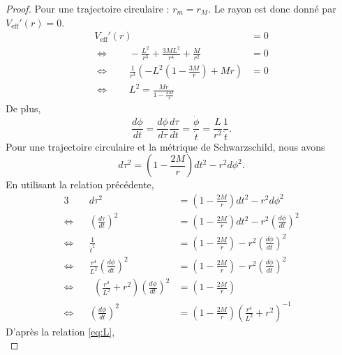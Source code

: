\documentclass[a4paper,11pt]{report}
\begin{document}
        \begin{proof}
            Pour une trajectoire circulaire : $r_m=r_M$. Le rayon est donc donné par $V_{\text{eff}}'(r) = 0$.
            \begin{align}
                V_{\text{eff}}'(r) &= 0\\
                \Leftrightarrow\qquad -\frac{L^2}{r^3}+\frac{3ML^2}{r^4}+\frac{M}{r^2} &= 0\\
                \Leftrightarrow\qquad \frac{1}{r^3}\left( -L^2\left( 1-\frac{3M}{r}\right)+Mr \right) &= 0 \\
                \Leftrightarrow\qquad L^2 = \frac{Mr}{1-\frac{3M}{r}}\label{eq:L}
            \end{align}
            De plus, 
            \begin{equation}
                \frac{d\phi}{dt} = \frac{d\phi}{d\tau}\frac{d\tau}{dt} = \frac{\dot{\phi}}{\dot{t}} = \frac{L}{r^2}\frac{1}{\dot{t}}.
            \end{equation}
            Pour une trajectoire circulaire et la métrique de Schwarzschild, nous avons
            \begin{equation}
                d\tau^2 = \left( 1-\frac{2M}{r} \right)dt^2-r^2 d\phi^2.
            \end{equation}
            En utilisant la relation précédente, 
            \begin{alignat}{3}
                && d\tau^2 &= \left( 1-\frac{2M}{r} \right)dt^2-r^2 d\phi^2\\
                \Leftrightarrow&& \left(\frac{d\tau}{dt}\right)^2 &= \left( 1-\frac{2M}{r} \right)dt^2-r^2 \left(\frac{d\phi}{dt}\right)^2 \\
                \Leftrightarrow&& \frac{1}{\dot{t}^2} &= \left( 1-\frac{2M}{r} \right)-r^2\left(\frac{d\phi}{dt}\right)^2\\
                \Leftrightarrow&& \frac{r^4}{L^2}\left(\frac{d\phi}{dt}\right)^2 &= \left( 1-\frac{2M}{r} \right)-r^2\left(\frac{d\phi}{dt}\right)^2\\
                \Leftrightarrow&&~~ \left( \frac{r^4}{L^2} + r^2 \right)\left(\frac{d\phi}{dt}\right)^2 &= \left( 1-\frac{2M}{r} \right)\\
                \Leftrightarrow&& \left(\frac{d\phi}{dt}\right)^2 &= \left( 1-\frac{2M}{r} \right) \left( \frac{r^4}{L^2} + r^2 \right)^{-1}\label{eq:findevphit}
            \end{alignat}
            D'après la relation \ref{eq:L}, 
            \begin{equation}

\end{equation}
\end{proof}
\end{document}
